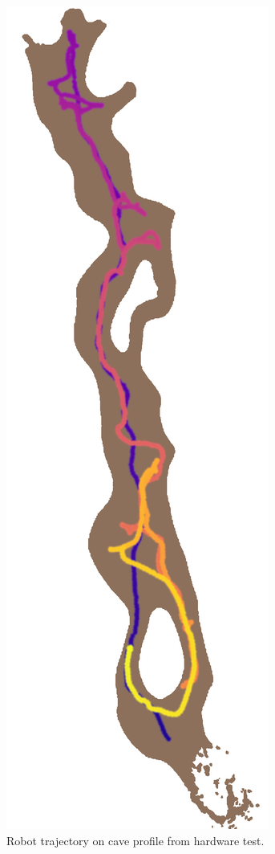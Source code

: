 \documentclass[letterpaper]{article} %
\begin{document}



\begin{figure}
     \centering
  \includegraphics[width=0.45\columnwidth,angle=90, scale=0.7
  ]{figures/darpa_tv_test_figs/cave_path_overlay_lightbrown.png}%
	\caption{Robot trajectory on cave profile from hardware test.}
    \label{fig:lava_tube_traj}
\end{figure}
\end{document}
